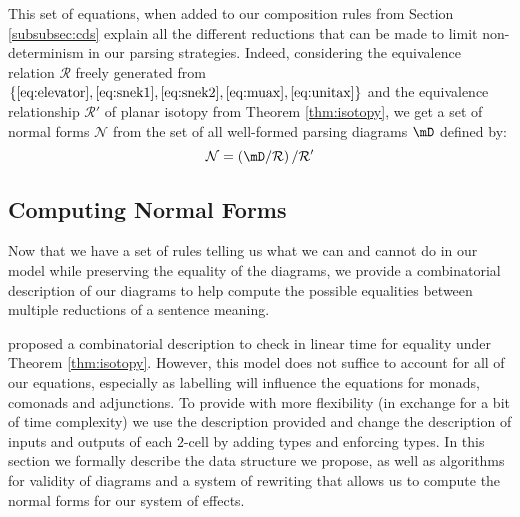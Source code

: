 \documentclass[math, english, info]{cours}
\begin{document}
This set of equations, when added to our composition rules from Section \ref{subsubsec:cds} explain all the different reductions that can be made to limit non-determinism in our parsing strategies.
Indeed, considering the equivalence relation $\mathcal{R}$ freely generated from $\left\{ \eqref{eq:elevator}, \eqref{eq:snek1}, \eqref{eq:snek2}, \eqref{eq:muax}, \eqref{eq:unitax} \right\}$ and the equivalence relationship $\mathcal{R}'$ of planar isotopy from Theorem \ref{thm:isotopy}, we get a set of normal forms $\mathcal{N}$ from the set of all well-formed parsing diagrams $\mD$ defined by:
\begin{equation*}
	\mathcal{N} = \left( \mD / \mathcal{R} \right) / \mathcal{R}'
\end{equation*}

\subsection{Computing Normal Forms}
Now that we have a set of rules telling us what we can and cannot do in our model while preserving the equality of the diagrams, we provide a combinatorial description of our diagrams to help compute the possible equalities between multiple reductions of a sentence meaning.

 proposed a combinatorial description to check
in linear time for equality under Theorem \ref{thm:isotopy}.
However, this model does not suffice to account for all of our equations, especially as
labelling will influence the equations for monads, comonads and adjunctions.
To provide with more flexibility (in exchange for a bit of time complexity) we use the
description provided and change the description of inputs and outputs of each $2$-cell by
adding types and enforcing types.
In this section we formally describe the data structure we propose, as well as algorithms for
validity of diagrams and a system of rewriting that allows us to compute the normal forms
for our system of effects.
\end{document}
